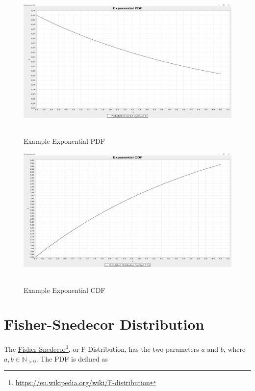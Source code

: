 		\begin{figure}[H]
			\centering
			\includegraphics[width=1\textwidth]{Figures/implemented_functions/exponential_pdf}~\\
			\caption{Example Exponential PDF}
			\label{fig:exponential_pdf}
		\end{figure}


		\begin{figure}[H]
			\centering
			\includegraphics[width=1\textwidth]{Figures/implemented_functions/exponential_cdf}~\\
			\caption{Example Exponential CDF}
			\label{fig:exponential_cdf}
		\end{figure}


	\section{Fisher-Snedecor Distribution} 

		The \href{https://en.wikipedia.org/wiki/F-distribution}{Fisher-Snedecor}\footnote{\url{https://en.wikipedia.org/wiki/F-distribution}}, or F-Distribution, has the two parameters $a$ and $b$, where $a,b \in \mathbb{N}_{>0}$. The \ac{PDF} is defined as

